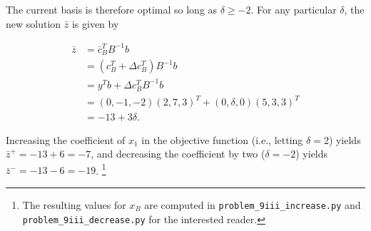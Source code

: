 \begin{solution}
  The current basis is therefore optimal so long as $\delta \ge -2$. For any particular $\delta$, the new solution 
  $\bar{z}$ is given by

  \begin{align*}
  \bar{z} &= \bar{c}_B^T B^{-1} b \\
          &= \left(c_B^T + \Delta c_B^T \right) B^{-1} b \\
          &= y^T b + \Delta c_B^T B^{-1} b \\
          &= (0, -1, -2)(2, 7,  3)^T + (0, \delta, 0)(5, 3, 3)^T \\
          &= -13 + 3\delta.
  \end{align*}

  Increasing the coefficient of $x_1$ in the objective function (i.e., letting $\delta = 2$) yields 
  $\bar{z}^+ = -13 + 6 = -7$, and decreasing the coefficient by two ($\delta = -2$) yields $\bar{z}^- = -13 - 6 = -19$.
  \footnote{
    The resulting values for $x_B$ are computed in \texttt{problem\_9iii\_increase.py} and 
    \texttt{problem\_9iii\_decrease.py} for the interested reader.
  }
  \ \\
  \vfill
\end{solution}
